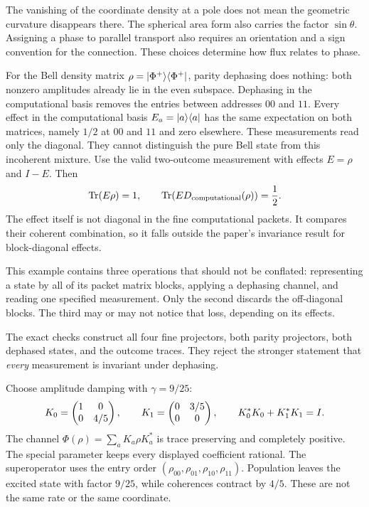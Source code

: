 The vanishing of the coordinate density at a pole does not mean the geometric curvature disappears there. The spherical area form also carries the factor $\sin\theta$. Assigning a phase to parallel transport also requires an orientation and a sign convention for the connection. These choices determine how flux relates to phase.

For the Bell density matrix $\rho=\lvert \Phi^+\rangle\langle \Phi^+\rvert$, parity dephasing does nothing: both nonzero amplitudes already lie in the even subspace. Dephasing in the computational basis removes the entries between addresses $00$ and $11$.
Every effect in the computational basis $E_a=\lvert a\rangle\langle a\rvert$ has the same expectation on both matrices, namely $1/2$ at $00$ and $11$ and zero elsewhere. These measurements read only the diagonal. They cannot distinguish the pure Bell state from this incoherent mixture.
Use the valid two-outcome measurement with effects $E=\rho$ and $I-E$. Then
\[
\operatorname{Tr}(E\rho)=1,\qquad
\operatorname{Tr}\!\left(E D_{\rm computational}(\rho)\right)=\frac12.
\]
The effect itself is not diagonal in the fine computational packets. It compares their coherent combination, so it falls outside the paper's invariance result for block-diagonal effects.

This example contains three operations that should not be conflated: representing a state by all of its packet matrix blocks, applying a dephasing channel, and reading one specified measurement. Only the second discards the off-diagonal blocks. The third may or may not notice that loss, depending on its effects.

The exact checks construct all four fine projectors, both parity projectors, both dephased states, and the outcome traces. They reject the stronger statement that \emph{every} measurement is invariant under dephasing.

Choose amplitude damping with $\gamma=9/25$:
\[
K_0=\begin{pmatrix}1&0\\0&4/5\end{pmatrix},\qquad
K_1=\begin{pmatrix}0&3/5\\0&0\end{pmatrix},\qquad K_0^*K_0+K_1^*K_1=I.
\]
The channel $\Phi(\rho)=\sum_aK_a\rho K_a^*$ is trace preserving and completely positive. The special parameter keeps every displayed coefficient rational.
The superoperator uses the entry order $(\rho_{00},\rho_{01},\rho_{10},\rho_{11})$. Population leaves the excited state with factor $9/25$, while coherences contract by $4/5$. These are not the same rate or the same coordinate.

